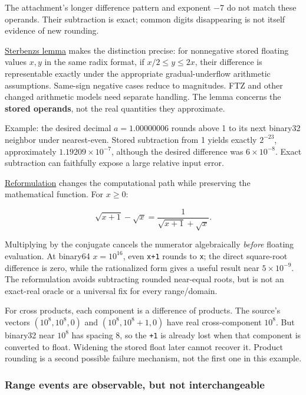 The attachment's longer difference pattern and exponent −7 do not match these operands. Their subtraction is exact; common digits disappearing is not itself evidence of new rounding.

\hyperref[appendix-399b7ad53f39]{Sterbenz\textquotesingle s lemma} makes the distinction precise: for nonnegative stored floating values \(x,y\) in the same radix format, if \(x/2\le y\le2x\), their difference is representable exactly under the appropriate gradual-underflow arithmetic assumptions. Same-sign negative cases reduce to magnitudes. FTZ and other changed arithmetic models need separate handling. The lemma concerns the \textbf{stored operands}, not the real quantities they approximate.

Example: the desired decimal \(a=1.00000006\) rounds above 1 to its next binary32 neighbor under nearest-even. Stored subtraction from 1 yields exactly \(2^{-23}\), approximately \(1.19209\times10^{-7}\), although the desired difference was \(6\times10^{-8}\). Exact subtraction can faithfully expose a large relative input error.

\hyperref[appendix-d7f8ba961670]{Reformulation} changes the computational path while preserving the mathematical function. For \(x\ge0\):

\[
\sqrt{x+1}-\sqrt{x}
=\frac{1}{\sqrt{x+1}+\sqrt{x}}.
\]

Multiplying by the conjugate cancels the numerator algebraically \emph{before} floating evaluation. At binary64 \(x=10^{16}\), even \texttt{x+1} rounds to \texttt{x}; the direct square-root difference is zero, while the rationalized form gives a useful result near \(5\times10^{-9}\). The reformulation avoids subtracting rounded near-equal roots, but is not an exact-real oracle or a universal fix for every range/domain.

For cross products, each component is a difference of products. The source's vectors \((10^8,10^8,0)\) and \((10^8,10^8+1,0)\) have real cross-component \(10^8\). But binary32 near \(10^8\) has spacing 8, so the \texttt{+1} is already lost when that component is converted to float. Widening the stored float later cannot recover it. Product rounding is a second possible failure mechanism, not the first one in this example.

\subsubsection{Range events are observable, but not interchangeable}\label{05-engine-i-ch001-range-events-are-observable-but-not-interchangeable}

